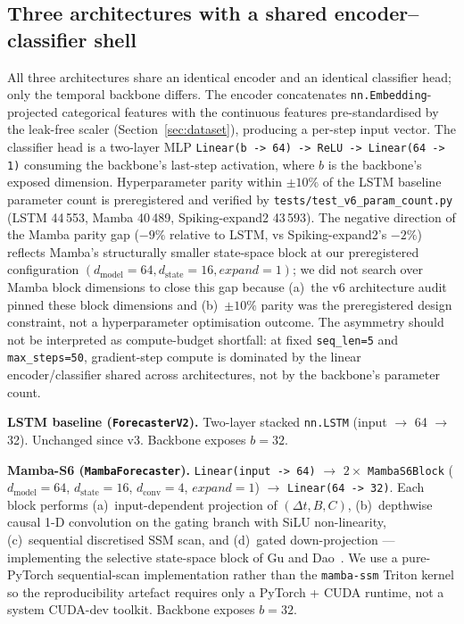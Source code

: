 \documentclass[journal]{IEEEtran}
\begin{document}
\subsection{Three architectures with a shared encoder--classifier shell}

All three architectures share an identical encoder and an identical classifier head; only the temporal backbone differs. The encoder concatenates \lstinline|nn.Embedding|-projected categorical features with the continuous features pre-standardised by the leak-free scaler (Section~\ref{sec:dataset}), producing a per-step input vector. The classifier head is a two-layer MLP \lstinline|Linear(b -> 64) -> ReLU -> Linear(64 -> 1)| consuming the backbone's last-step activation, where $b$ is the backbone's exposed dimension. Hyperparameter parity within $\pm 10\%$ of the LSTM baseline parameter count is preregistered and verified by \lstinline|tests/test_v6_param_count.py| (LSTM 44\,553, Mamba 40\,489, Spiking-expand2 43\,593). The negative direction of the Mamba parity gap ($-9\%$ relative to LSTM, vs Spiking-expand2's $-2\%$) reflects Mamba's structurally smaller state-space block at our preregistered configuration $(d_{\mathrm{model}}=64, d_{\mathrm{state}}=16, \mathit{expand}=1)$; we did not search over Mamba block dimensions to close this gap because (a)~the v6 architecture audit pinned these block dimensions and (b)~$\pm 10\%$ parity was the preregistered design constraint, not a hyperparameter optimisation outcome. The asymmetry should not be interpreted as compute-budget shortfall: at fixed \lstinline|seq_len=5| and \lstinline|max_steps=50|, gradient-step compute is dominated by the linear encoder/classifier shared across architectures, not by the backbone's parameter count.

\textbf{LSTM baseline (\lstinline|ForecasterV2|).} Two-layer stacked \lstinline|nn.LSTM| (input $\rightarrow$ 64 $\rightarrow$ 32). Unchanged since v3. Backbone exposes $b=32$.

\textbf{Mamba-S6 (\lstinline|MambaForecaster|).} \lstinline|Linear(input -> 64)| $\rightarrow$ $2 \times$ \lstinline|MambaS6Block| ($d_{\mathrm{model}}=64$, $d_{\mathrm{state}}=16$, $d_{\mathrm{conv}}=4$, $\mathit{expand}=1$) $\rightarrow$ \lstinline|Linear(64 -> 32)|. Each block performs (a)~input-dependent projection of $(\Delta t, B, C)$, (b)~depthwise causal 1-D convolution on the gating branch with SiLU non-linearity, (c)~sequential discretised SSM scan, and (d)~gated down-projection --- implementing the selective state-space block of Gu and Dao~\cite{GuDao2023_Mamba}. We use a pure-PyTorch sequential-scan implementation rather than the \lstinline|mamba-ssm| Triton kernel so the reproducibility artefact requires only a PyTorch + CUDA runtime, not a system CUDA-dev toolkit. Backbone exposes $b=32$.
\end{document}
